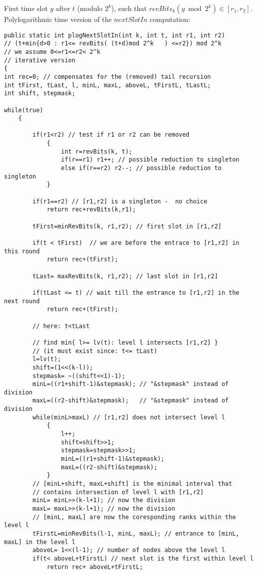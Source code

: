 First time slot $y$ after $t$ (modulo $2^k$), 
such that $revBits_k(y\bmod 2^k) \in [r_1, r_2]$.
Polylogarithmic time version of the $nextSlotIn$ computation:
\begin{verbatim}
public static int plogNextSlotIn(int k, int t, int r1, int r2)
// (t+min{d>0 : r1<= revBits( (t+d)mod 2^k   ) <=r2}) mod 2^k 
// we assume 0<=r1<=r2< 2^k 
// iterative version
{
int rec=0; // compensates for the (removed) tail recursion
int tFirst, tLast, l, minL, maxL, aboveL, tFirstL, tLastL;
int shift, stepmask;

while(true)
    {

        if(r1<r2) // test if r1 or r2 can be removed
            {
                int r=revBits(k, t);
                if(r==r1) r1++; // possible reduction to singleton
                else if(r==r2) r2--; // possible reduction to singleton
            }

        if(r1==r2) // [r1,r2] is a singleton -  no choice
            return rec+revBits(k,r1); 

        tFirst=minRevBits(k, r1,r2); // first slot in [r1,r2]

        if(t < tFirst)  // we are before the entrace to [r1,r2] in this round
            return rec+(tFirst);

        tLast= maxRevBits(k, r1,r2); // last slot in [r1,r2]

        if(tLast <= t) // wait till the entrance to [r1,r2] in the next round 
            return rec+(tFirst); 

        // here: t<tLast

        // find min{ l>= lv(t): level l intersects [r1,r2] } 
        // (it must exist since: t<= tLast) 
        l=lv(t);
        shift=(1<<(k-l));
        stepmask= ~((shift<<1)-1);
        minL=((r1+shift-1)&stepmask); // "&stepmask" instead of division
        maxL=((r2-shift)&stepmask);   // "&stepmask" instead of division
        while(minL>maxL) // [r1,r2] does not intersect level l
            {
                l++;
                shift=shift>>1;
                stepmask=stepmask>>1;
                minL=((r1+shift-1)&stepmask);
                maxL=((r2-shift)&stepmask);
            }
        // [minL+shift, maxL+shift] is the minimal interval that 
        // contains intersection of level l with [r1,r2] 
        minL= minL>>(k-l+1); // now the division
        maxL= maxL>>(k-l+1); // now the division
        // [minL, maxL] are now the coresponding ranks within the level l
        tFirstL=minRevBits(l-1, minL, maxL); // entrance to [minL, maxL] in the level l 
        aboveL= 1<<(l-1); // number of nodes above the level l 
        if(t< aboveL+tFirstL) // next slot is the first within level l		       
            return rec+ aboveL+tFirstL; 



\end{verbatim}

